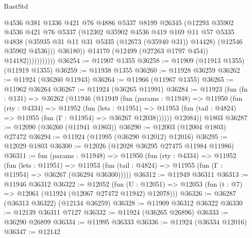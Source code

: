\begin{lexlean}{RustStd}
\begin{coremodule}
                              @4536
                              @381
                              @1336
                              @421
                              @76
                              @4886
                              @5337
                              @8199
                              @26345
                              (@12293
                                @35902
                                @4536
                                @421
                                @76
                                @5337
                                (@12302
                                  @35902
                                  @4536
                                  @419
                                  @169
                                  @11
                                  @57
                                  @5335
                                  @4838
                                  (@35935 @31 @11 @31 @5335 (@12673 (@35940 @31)) @14428)
                                  (@12546 @35902 @4536)))
                              @36180))
                          @14170
                          (@12499 (@27263 @1797 @454))
                          @14182)))))))))))
@36254 := @11907 @1355
@36258 := @11909 (@11913 @1355) (@11919 @1355)
@36259 := @11938 @1355
@36260 := @11928 @36259
@36262 := @11924 (@36260 @11943)
@36264 := @11966 (@11967 @1355)
@36265 := @11962 @36264
@36267 := @11924 (@36265 @11991)
@36284 := @11923
    (fun (fn : @131) =>
    @36262
      (@11946
        (@11949
          (fun (params : @11948) =>
          @11950
            (fun (rty : @4334) =>
            @11952
              (fun (lets : @11951) =>
              @11953 (fun (tail : @4824) => @11955 (fun (Γ : @11954) => @36267 @12038))))))
        @12084))
    @1803
@36287 := @12090 (@36260 (@11941 @1803))
@36290 := @12003 (@12004 @1803) @27472
@36294 := @11924 (@11995 (@36290 @12012) @12016)
@36295 := @12029 @1803
@36300 := @12026 (@12028 @36295 @27475 @11984 @11986)
@36311 := fun (params : @11948) =>
  @11950
    (fun (rty : @4334) =>
    @11952
      (fun (lets : @11951) =>
      @11953 (fun (tail : @4824) => @11955 (fun (Γ : @11954) => @36267 (@36294 @36300)))))
@36312 := @11949 @36311
@36313 := @11946 @36312
@36322 := @12052
    (fun (U : @12051) => @12053 (fun (t : @7) => @12061 (@11924 (@12067 @27472 @11942) @12078)))
@36326 := @36287 (@36313 @36322) (@12134 @36259)
@36328 := @11909 @36312 @36322
@36330 := @12139 @36311 @7127
@36332 := @11924 (@36265 @26896)
@36333 := @36290 @26899
@36334 := @11995 @36333
@36336 := @11924 (@36334 @12016)
@36347 := @12142

\end{coremodule}
\end{lexlean}
